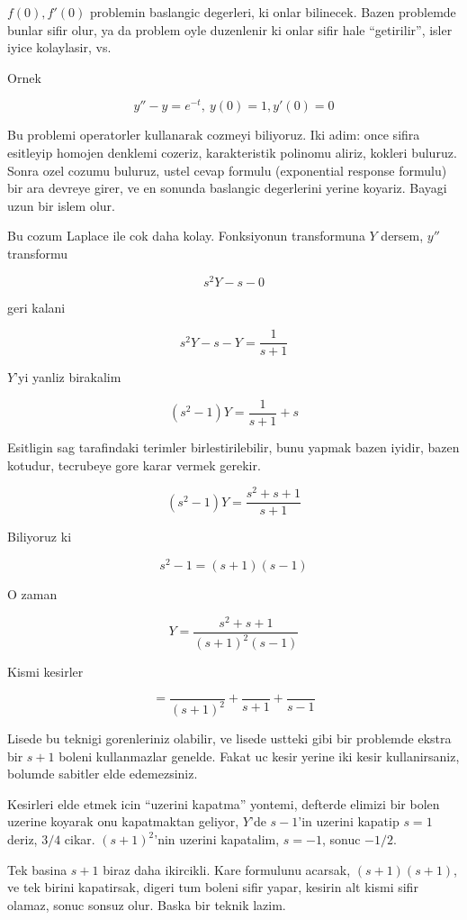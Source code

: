 \documentclass[12pt,fleqn]{article}\usepackage{../common}
\begin{document}
$f(0),f'(0)$ problemin baslangic degerleri, ki onlar bilinecek. Bazen
problemde bunlar sifir olur, ya da problem oyle duzenlenir ki onlar sifir
hale ``getirilir'', isler iyice kolaylasir, vs.

Ornek

\[ y'' - y = e^{-t}, \ y(0) = 1, y'(0)=0 \]

Bu problemi operatorler kullanarak cozmeyi biliyoruz. Iki adim: once sifira
esitleyip homojen denklemi cozeriz, karakteristik polinomu aliriz, kokleri
buluruz. Sonra ozel cozumu buluruz, ustel cevap formulu (exponential
response formulu) bir ara devreye girer, ve en sonunda baslangic
degerlerini yerine koyariz. Bayagi uzun bir islem olur. 

Bu cozum Laplace ile cok daha kolay. Fonksiyonun transformuna $Y$ dersem,
$y''$ transformu

\[ s^2Y - s - 0\]

geri kalani

\[ s^2Y - s - Y = \frac{1}{s+1}\]

$Y$'yi yanliz birakalim

\[ (s^2-1)Y = \frac{1}{s+1} + s \]

Esitligin sag tarafindaki terimler birlestirilebilir, bunu yapmak bazen
iyidir, bazen kotudur, tecrubeye gore karar vermek gerekir. 

\[ (s^2-1)Y = \frac{s^2+s+1}{s+1} \]

Biliyoruz ki

\[ s^2-1 = (s+1)(s-1) \]

O zaman 

\[ Y = \frac{s^2+s+1}{(s+1)^2(s-1)} \]


Kismi kesirler 

\[ = \frac{}{(s+1)^2} + \frac{}{s+1} + \frac{}{s-1} \]


Lisede bu teknigi gorenleriniz olabilir, ve lisede ustteki gibi bir
problemde ekstra bir $s+1$ boleni kullanmazlar genelde. Fakat uc kesir
yerine iki kesir kullanirsaniz, bolumde sabitler elde edemezsiniz. 

Kesirleri elde etmek icin ``uzerini kapatma'' yontemi, defterde elimizi bir
bolen uzerine koyarak onu kapatmaktan geliyor, $Y$'de  $s-1$'in
uzerini kapatip $s=1$ deriz, $3/4$ cikar. $(s+1)^2$'nin uzerini kapatalim,
$s=-1$, sonuc $-1/2$. 

Tek basina $s+1$ biraz daha ikircikli. Kare formulunu acarsak,
$(s+1)(s+1)$, ve tek birini kapatirsak, digeri tum boleni sifir yapar,
kesirin alt kismi sifir olamaz, sonuc sonsuz olur. Baska bir teknik lazim. 
\end{document}
